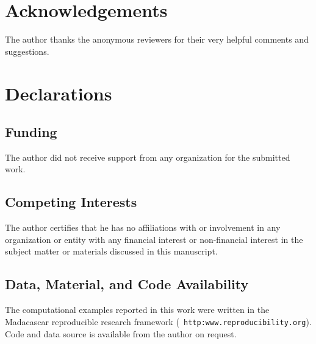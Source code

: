 \documentclass[georeport,12pt]{geophysics}
\begin{document}
\section{Acknowledgements}
The author thanks the anonymous reviewers for their very helpful
comments and suggestions.

\section{Declarations}
\subsection{Funding}
The author did not receive support from any organization for the
submitted work.
\subsection{Competing Interests}
The author certifies that he has no affiliations with or involvement
in any organization or entity with any financial interest or
non-financial interest in the subject matter or materials discussed in
this manuscript.
\subsection{Data, Material, and Code Availability}
The computational examples reported in this work were written in the
Madacascar reproducible research framework ({\tt
  http:www.reproducibility.org}). Code and data source is available
from the author on request.




\end{document}

